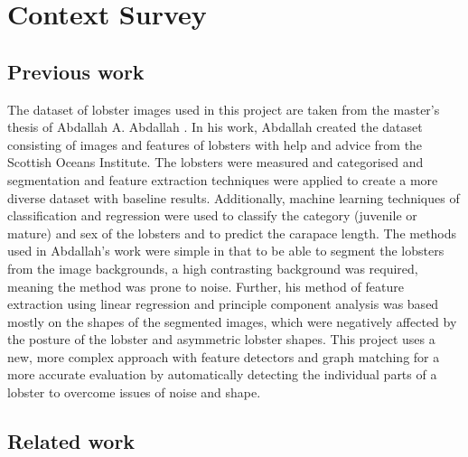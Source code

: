 \section{Context Survey}
\renewcommand{\imgpath}{tex/litreview/imgs}

\subsection{Previous work}
The dataset of lobster images used in this project are taken from the master's thesis of Abdallah A. Abdallah \cite{lobster-thesis}. In his work, Abdallah created the dataset consisting of images and features of lobsters with help and advice from the Scottish Oceans Institute. The lobsters were measured and categorised and segmentation and feature extraction techniques were applied to create a more diverse dataset with baseline results. Additionally, machine learning techniques of classification and regression were used to classify the category (juvenile or mature) and sex of the lobsters and to predict the carapace length. 
\n
The methods used in Abdallah's work were simple in that to be able to segment the lobsters from the image backgrounds, a high contrasting background was required, meaning the method was prone to noise. Further, his method of feature extraction using linear regression and principle component analysis was based mostly on the shapes of the segmented images, which were negatively affected by the posture of the lobster and asymmetric lobster shapes. This project uses a new, more complex approach with feature detectors and graph matching for a more accurate evaluation by automatically detecting the individual parts of a lobster to overcome issues of noise and shape. 

\subsection{Related work}

